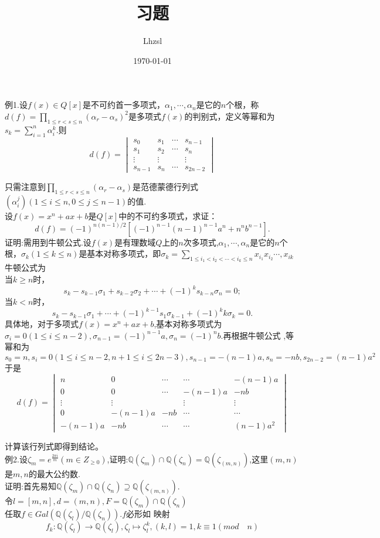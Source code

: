 \documentclass[UTF8]{article}
\title{习题}
\author{Lhzsl}
\date{\today }
\begin{document}
	例1.设$f(x)\in Q[x]$是不可约首一多项式，$\alpha_{1},\cdots,\alpha_{n}$是它的$n$个根，称$d(f)=\prod_{1\leq r<s\leq n}(\alpha_{r}-\alpha_{s})^{2}$是多项式$f(x)$的判别式，定义等幂和为$s_{k}=\sum_{i=1}^{n}\alpha_{i}^{k}$.则
	$$
	d(f)=\begin{vmatrix}
	s_{0}&s_{1}&\cdots &s_{n-1}\\
	s_{1}&s_{2}&\cdots &s_{n}\\
	\vdots&\vdots& &\vdots \\
	s_{n-1}&s_{n}&\cdots&s_{2n-2}
\end{vmatrix}
$$

	只需注意到$\prod_{1\leq r<s\leq n}(\alpha_{r}-\alpha_{s})$是范德蒙德行列式$(\alpha_{i}^{j})(1\leq i\leq n,0\leq j\leq n-1)$的值.\\
	设$f(x)=x^{n}+ax+b$是$Q[x]$中的不可约多项式，求证：
	$$d(f)=(-1)^{n(n-1)/2}[(-1)^{n-1}(n-1)^{n-1}a^{n}+n^{n}b^{n-1}].$$
	证明:需用到牛顿公式.设$f(x)$是有理数域$Q$上的$n$次多项式,$\alpha_{1},\cdots,\alpha_{n}$是它的$n$个根，$\sigma_{k}(1\leq k\leq n)$是基本对称多项式，即$
	\sigma_{k}=\sum_{1\leq i_{1}<i_{2}<\cdots<i_{k}\leq n}x_{i_{1}}x_{i_{2}}\cdots,x_{i{k}}
	$
	牛顿公式为\\
	当$k\geq n$时，
	$$
	s_{k}-s_{k-1}\sigma_{1}+s_{k-2}\sigma_{2}+\cdots+(-1)^{k}s_{k-n}\sigma_{n}=0;
	$$
	当$k<n$时，
	$$
	s_{k}-s_{k-1}\sigma_{1}+\cdots+(-1)^{k-1}s_{1}\sigma_{k-1}+(-1)^{k}k\sigma_{k}=0.
	$$
	具体地，对于多项式$f(x)=x^{n}+ax+b$,基本对称多项式为$\sigma_{i}=0(1\leq i\leq n-2),\sigma_{n-1}=(-1)^{n-1}a,\sigma_{n}=(-1)^{n}b.$再根据牛顿公式
	,等幂和为$$s_{0}=n,s_{i}=0(1\leq i\leq n-2,n+1\leq i\leq 2n-3),s_{n-1}=-(n-1)a,s_{n}=-nb,s_{2n-2}=(n-1)a^{2}$$
	于是
	$$
		d(f)=\begin{vmatrix}
		n&0&\cdots &\cdots&-(n-1)a\\
		0&0&\cdots&-(n-1)a &-nb\\
		\vdots&\vdots&\ &\vdots& \vdots\\
		0&-(n-1)a&-nb &\cdots&\cdots \\
		-(n-1)a&-nb&\cdots&\cdots&(n-1)a^{2}
	\end{vmatrix}
	$$
	
	计算该行列式即得到结论。\\
	例2.设$\zeta_{m}=e^{\frac{2\pi i}{m}}(m\in Z_{\geq 0})$,证明:$\mathbb{Q}(\zeta_{m})\cap \mathbb{Q}(\zeta_{n})=\mathbb{Q}(\zeta_{(m,n)})$,这里$(m,n)$是$m,n$的最大公约数.\\
	证明:首先易知$\mathbb{Q}(\zeta_{m})\cap \mathbb{Q}(\zeta_{n})\supseteq\mathbb{Q}(\zeta_{(m,n)}).$\\
	令$l=[m,n],d=(m,n),F=\mathbb{Q}(\zeta_{m})\cap \mathbb{Q}(\zeta_{n})$\\
	任取$f\in Gal(\mathbb{Q}(\zeta_{l})/\mathbb{Q}(\zeta_{n})).$$f$必形如
	映射$$f_{k}:\mathbb{Q}(\zeta_{l})\rightarrow \mathbb{Q}(\zeta_{l}),
	\zeta_{l}\mapsto \zeta_{l}^{k},(k,l)=1,k\equiv 1(mod\quad n)$$
	
\end{document}
